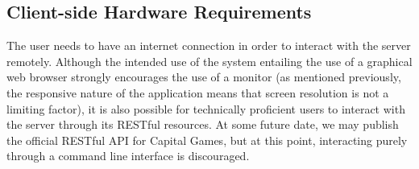 \subsection{Client-side Hardware Requirements}

The user needs to have an internet connection in order
to interact with the server remotely. Although the intended
use of the system entailing the use of a graphical web browser
strongly encourages the use of a monitor (as mentioned
previously, the responsive nature of the application means
that screen resolution is not a limiting factor), it is also
possible for technically proficient users to interact with the
server through its RESTful resources. At some future date,
we may publish the official RESTful API for Capital Games, but
at this point, interacting purely through a command line
interface is discouraged.
